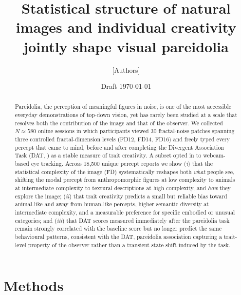 \documentclass[11pt]{article}
\title{Statistical structure of natural images and individual creativity\\
       jointly shape visual pareidolia}
\author{[Authors]}
\date{Draft \today}
\begin{document}
\maketitle

\begin{abstract}
\noindent
Pareidolia, the perception of meaningful figures in noise, is one
of the most accessible everyday demonstrations of top-down vision, yet
has rarely been studied at a scale that resolves both the contribution
of the image and that of the observer. We collected $N \approx 580$
online sessions in which participants viewed 30 fractal-noise patches
spanning three controlled fractal-dimension levels (FD12, FD14, FD16)
and freely typed every percept that came to mind, before and after
completing the Divergent Association Task (DAT,
\citealp{Olson2021dat}) as a stable measure of trait creativity. A
subset opted in to webcam-based eye tracking. Across 18{,}500 unique
percept reports we show (\emph{i}) that the statistical complexity of
the image (FD) systematically reshapes both \emph{what} people see, 
shifting the modal percept from anthropomorphic figures at low
complexity to animals at intermediate complexity to textural
descriptions at high complexity, and \emph{how} they explore the
image; (\emph{ii}) that trait creativity predicts a small but reliable
bias toward animal-like and away from human-like percepts, higher
semantic diversity at intermediate complexity, and a measurable
preference for specific embodied or unusual categories;
and (\emph{iii}) that DAT scores measured immediately after the
pareidolia task remain strongly correlated with the baseline score but
no longer predict the same behavioural patterns, consistent with the
DAT, pareidolia association capturing a trait-level property of the
observer rather than a transient state shift induced by the task.
\end{abstract}

\section{Methods}
\end{document}
